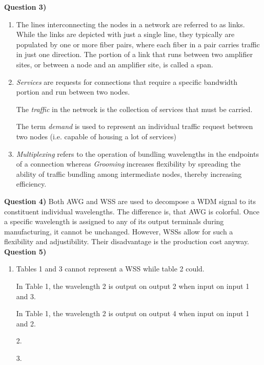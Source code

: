 \documentclass[10pt,letterpaper]{article}
\newcommand{\Q}[1]{\textbf{Question #1)}}
\newcommand{\nl}{\newline\newline}
\begin{document}
\Q3
\begin{enumerate}
\item
The lines interconnecting the nodes in a network are referred to as links. While the links are depicted
with just a single line, they typically are populated by one or more fiber pairs,
where each fiber in a pair carries traffic in just one direction. The portion of a
link that runs between two amplifier sites, or between a node and an amplifier site,
is called a span.
\item
\textit{Services} are requests for connections that require a specific bandwidth portion and run between two nodes. 

The \textit{traffic} in the network is the collection of services that must be carried.

The term \textit{demand} is used to represent an individual traffic request between two nodes (i.e. capable of housing a lot of services)
\item
\textit{Multiplexing} refers to the operation of bundling wavelengths in the endpoints of a connection whereas \textit{Grooming} increases flexibility by spreading the ability of traffic bundling among intermediate nodes, thereby increasing efficiency.
\end{enumerate}
\Q4
Both AWG and WSS are used to decompose a WDM signal to its constituent individual wavelengths. The difference is, that AWG is colorful. Once a specific wavelength is assigned to any of its output terminals during manufacturing, it cannot be unchanged. However, WSSs allow for such a flexibility and adjustibility. Their disadvantage is the production cost anyway.
\nl
\Q5
\begin{enumerate}
\item
Tables 1 and 3 cannot represent a WSS while table 2 could.

In Table 1, the wavelength 2 is output on output 2 when input on input 1 and 3.

In Table 1, the wavelength 2 is output on output 4 when input on input 1 and 2.

2.


3.

\end{enumerate}
\end{document}
